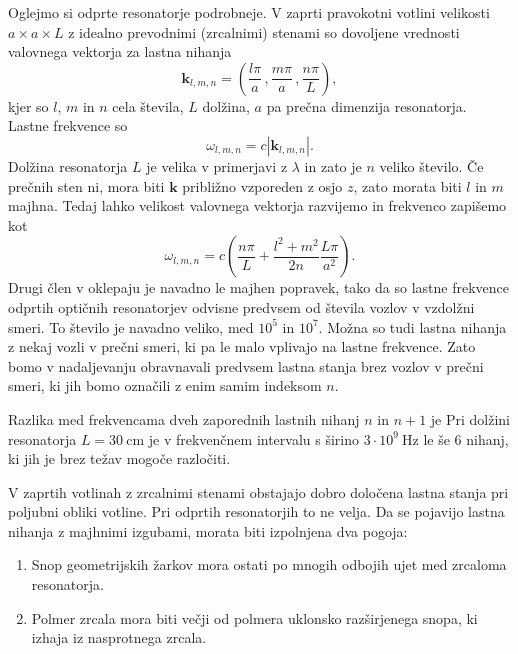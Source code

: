 Oglejmo si odprte resonatorje podrobneje. V zaprti pravokotni votlini velikosti
$a\times a\times L$ z idealno prevodnimi (zrcalnimi) stenami so dovoljene vrednosti
valovnega vektorja za lastna nihanja 
\begin{equation}
\mathbf{k}_{l,m,n}=\left(\frac{l\pi}{a}\,,\frac{m\pi}{a}\,,\frac{n\pi}{L}\right),\label{eq:k-votlina}
\end{equation}
 kjer so $l$, $m$ in $n$ cela števila, $L$ dolžina, $a$ pa prečna
dimenzija resonatorja. Lastne frekvence so 
\begin{equation}
\omega_{l,m,n}=c|\mathbf{k}_{l,m,n}|.\label{eq:omega-votlina}
\end{equation}
Dolžina resonatorja $L$ je velika v primerjavi z $\lambda$ in zato je $n$
veliko število. Če prečnih sten ni, mora biti $\mathbf{k}$ približno
vzporeden z osjo $z$, zato morata biti $l$ in $m$ majhna. Tedaj
lahko velikost valovnega vektorja razvijemo in frekvenco zapišemo kot
\begin{equation}
\omega_{l,m,n}=c\left(\frac{n\pi}{L}+\frac{l^{2}+m^{2}}{2n}\frac{L \pi}{a^{2}}\right).
\label{eq:delta-omega-resonator-razvoj}
\end{equation}
Drugi člen v oklepaju je navadno le majhen popravek, tako da so
lastne frekvence odprtih optičnih resonatorjev odvisne predvsem od
števila vozlov v vzdolžni smeri. To število je navadno veliko, med $10^{5}$
in $10^{7}$. Možna so tudi lastna nihanja z nekaj vozli v prečni
smeri, ki pa le malo vplivajo na lastne frekvence. Zato bomo v nadaljevanju
obravnavali predvsem lastna stanja brez vozlov v prečni smeri, ki
jih bomo označili z enim samim indeksom $n$.

Razlika med frekvencama dveh zaporednih lastnih nihanj 
$n$ in $n+1$ je
Pri dolžini resonatorja $L=30~\si{\centi\metre}$ je v frekvenčnem
intervalu s širino $3\cdot10^{9}~\si{\hertz}$ le še $6$ nihanj, ki jih
je brez težav mogoče razločiti.

V zaprtih votlinah z zrcalnimi stenami obstajajo dobro določena lastna
stanja pri poljubni obliki votline. Pri odprtih resonatorjih to ne velja.
Da se pojavijo lastna nihanja z majhnimi izgubami, morata
biti izpolnjena dva pogoja:

\begin{enumerate} 
\item Snop geometrijskih žarkov mora ostati po mnogih odbojih ujet med zrcaloma resonatorja.\\
\item Polmer zrcala mora biti večji od polmera uklonsko razširjenega snopa, ki izhaja iz nasprotnega zrcala. 
\end{enumerate}

